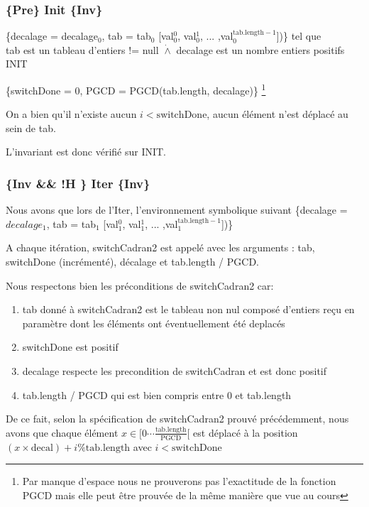 \subsubsection*{\{Pre\} Init \{Inv\}}

\{decalage = decalage$_{0}$, tab = tab$_{0}$ [val$_{0}^{0}$, val$_{0}^{1}$, ... ,val$_{0}^{\mathrm{tab.length}-1}$])\} tel que \\tab est un tableau d'entiers != null
$\dot{\wedge}$ decalage est un nombre entiers positifs\\

INIT

\{switchDone = 0, PGCD = PGCD(tab.length, decalage)\} \footnote{Par manque d'espace nous ne prouverons pas l'exactitude de la fonction PGCD mais elle peut être prouvée de la même manière que vue au cours}

On a bien qu'il n'existe aucun $i < \mathrm{switchDone}$, aucun élément n'est déplacé au sein de tab.

L'invariant est donc vérifié sur INIT.

\subsubsection*{\{Inv \&\& !H \} Iter \{Inv\}}

Nous avons que lors de l'Iter, l'environnement symbolique suivant \{decalage = $decalage_{1}$, tab = tab$_{1}$ [val$_{1}^{0}$, val$_{1}^{1}$, ... ,val$_{1}^{\mathrm{tab.length-1}}$])\}

A chaque itération, switchCadran2 est appelé avec les arguments : tab,
switchDone (incrémenté), décalage et tab.length / PGCD.

Nous respectons bien les préconditions de switchCadran2 car:
\begin{enumerate}
 \item tab donné à switchCadran2 est le tableau non nul composé d'entiers reçu en paramètre dont les éléments ont éventuellement été deplacés
 \item switchDone est positif
 \item decalage respecte les precondition de switchCadran et est donc positif
 \item tab.length / PGCD qui est bien compris entre 0 et tab.length
\end{enumerate}


De ce fait,
selon la spécification de switchCadran2 prouvé précédemment, nous avons
que chaque élément $x \in [0\cdots
    \frac{\mathrm{tab.length}}{\mathrm{PGCD}}[$ est déplacé à la
        position $(x\times \mathrm{decal})+i \% \mathrm{tab.length}$ avec $i < \mathrm{switchDone}$

